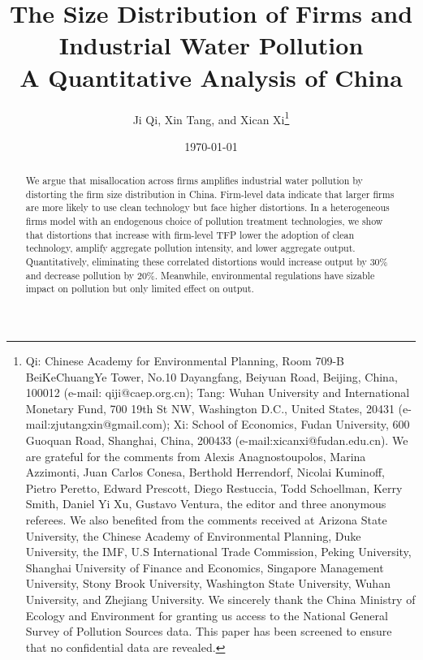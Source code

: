 \documentclass[AEJ]{AEA}
\begin{document}
\title{The Size Distribution of Firms and Industrial Water Pollution \\ A Quantitative Analysis of China}
\author{Ji Qi, Xin Tang, and Xican Xi\thanks{%
Qi: Chinese Academy for Environmental Planning, Room 709-B BeiKeChuangYe Tower, No.10 Dayangfang, Beiyuan Road, Beijing, China, 100012 (e-mail: qiji@caep.org.cn); Tang: Wuhan University and International Monetary Fund, 700 19th St NW, Washington D.C., United States, 20431 (e-mail:zjutangxin@gmail.com); Xi: School of Economics, Fudan University, 600 Guoquan Road, Shanghai, China, 200433 (e-mail:xicanxi@fudan.edu.cn). We are grateful for the comments from Alexis Anagnostoupolos, Marina Azzimonti, Juan Carlos Conesa, Berthold Herrendorf, Nicolai Kuminoff, Pietro Peretto, Edward Prescott, Diego Restuccia, Todd Schoellman, Kerry Smith, Daniel Yi Xu, Gustavo Ventura, the editor and three anonymous referees. We also benefited from the comments received at Arizona State University, the Chinese Academy of Environmental Planning, Duke University, the IMF, U.S International Trade Commission, Peking University, Shanghai University of Finance and Economics, Singapore Management University, Stony Brook University, Washington State University, Wuhan University, and Zhejiang University. We sincerely thank the China Ministry of Ecology and Environment for granting us access to the National General Survey of Pollution Sources data. This paper has been screened to ensure that no confidential data are revealed.}}
\date{\today}

\begin{abstract}
    We argue that misallocation across firms amplifies industrial water pollution by distorting the firm size distribution in China. Firm-level data indicate that larger firms are more likely to use clean technology but face higher distortions. In a heterogeneous firms model with an endogenous choice of pollution treatment technologies, we show that distortions that increase with firm-level TFP lower the adoption of clean technology, amplify aggregate pollution intensity, and lower aggregate output. Quantitatively, eliminating these correlated distortions would increase output by 30\% and decrease pollution by 20\%. Meanwhile, environmental regulations have sizable impact on pollution but only limited effect on output.
\end{abstract}
\end{document}
